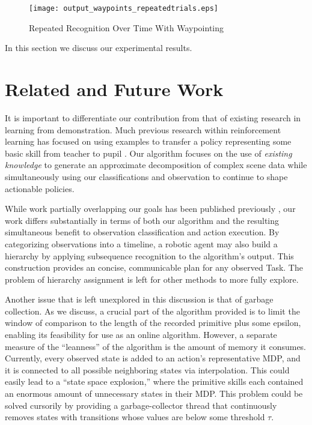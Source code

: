 \documentclass[letterpaper]{article}
\begin{document}
\begin{figure}
\begin{center}
\texttt{[image: output\_waypoints\_repeatedtrials.eps]}
\caption{Repeated Recognition Over Time With Waypointing}
\label{fig:output_nowaypoints_repeatedtrials}
\end{center}
\end{figure}

In this section we discuss our experimental results.

\section{Related and Future Work}
\label{sec:future}
It is important to differentiate our contribution from that of
existing research in learning from demonstration.  Much previous research
within reinforcement learning has focused on using examples to
transfer a policy representing some basic skill from teacher to
pupil \cite{JenkinsLFD,LFDSurvey}.  Our algorithm focuses on the use of
\textit{existing knowledge} to generate an approximate decomposition of
complex scene data while simultaneously using our classifications and 
observation to continue to shape actionable policies.

While work partially overlapping our goals has been published previously
\cite{LearningBehaviorFusion}, our work differs substantially in terms of both
our algorithm and the resulting simultaneous benefit to observation
classification and action execution. By categorizing observations into a timeline, a robotic agent may also build a hierarchy by applying subsequence recognition to the algorithm's output. This construction provides an concise, communicable plan for any observed Task. The problem of hierarchy assignment is left for other methods to more fully explore.

Another issue that is left unexplored in this discussion is that of garbage collection.  As we discuss, a crucial part of the algorithm provided is to limit the window of comparison to the length of the recorded primitive plus some epsilon, enabling its feasibility for use as an online algorithm.  However, a separate measure of the ``leanness'' of the algorithm is the amount of memory it consumes.  Currently, every observed state is added to an action's representative MDP, and it is connected to all possible neighboring states via interpolation.  This could easily lead to a ``state space explosion,'' where the primitive skills each contained an enormous amount of unnecessary states in their MDP.  This problem could be solved cursorily by providing a garbage-collector thread that continuously removes states with transitions whose values are below some threshold $\tau$.
\end{document}
